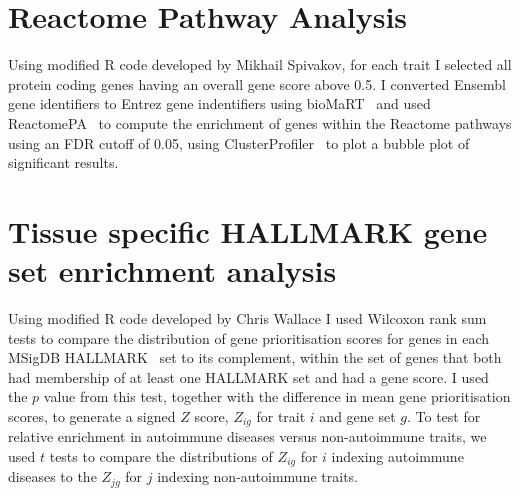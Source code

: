 \documentclass[a4paper,11pt]{report}
\begin{document}

\section{Reactome Pathway Analysis}
Using modified R code developed by Mikhail Spivakov, for each trait I selected all protein coding genes having an overall gene score above 0.5. I converted Ensembl gene identifiers to Entrez gene indentifiers using bioMaRT~\citep{DurinckSpellmanBirneyEtAl2009} and used ReactomePA~\citep{YuHe2016} to compute the enrichment of genes within the Reactome pathways using an FDR cutoff of 0.05, using ClusterProfiler~\citep{YuWangHanEtAl2012} to plot a bubble plot of significant results.  


\section{Tissue specific HALLMARK gene set enrichment analysis}
Using modified R code developed by Chris Wallace  I used Wilcoxon rank sum tests to compare the distribution of gene prioritisation scores for genes in each MSigDB HALLMARK~\citep{LiberzonBirgerThorvaldsdottirEtAl2015} set to its complement, within the set of genes that both had membership of at least one HALLMARK set and had a gene score.  I used the $p$ value from this test, together with the difference in mean gene prioritisation scores, to generate a signed $Z$ score, $Z_{ig}$ for trait $i$ and gene set $g$.  To test for relative enrichment in autoimmune diseases versus non-autoimmune traits, we used $t$ tests to compare the distributions of $Z_{ig}$ for $i$ indexing autoimmune diseases to the $Z_{jg}$ for $j$ indexing non-autoimmune traits.
\end{document}
